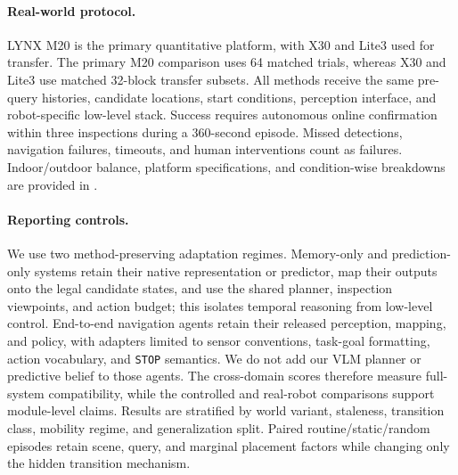 \paragraph{}

\paragraph{Real-world protocol.}
LYNX M20 is the primary quantitative platform, with X30 and Lite3 used for
transfer. The primary M20 comparison uses 64 matched trials, whereas X30 and
Lite3 use matched 32-block transfer subsets. All methods receive the same
pre-query histories, candidate locations, start conditions, perception interface,
and robot-specific low-level stack. Success requires autonomous online
confirmation within three inspections during a 360-second episode. Missed
detections, navigation failures, timeouts, and human interventions count as
failures. Indoor/outdoor balance, platform specifications, and condition-wise
breakdowns are provided in .

\paragraph{Reporting controls.}
We use two method-preserving adaptation regimes. Memory-only and
prediction-only systems retain their native representation or predictor, map
their outputs onto the legal candidate states, and use the shared planner,
inspection viewpoints, and action budget; this isolates temporal reasoning
from low-level control. End-to-end navigation agents retain their released
perception, mapping, and policy, with adapters limited to sensor conventions,
task-goal formatting, action vocabulary, and \texttt{STOP} semantics. We do not
add our VLM planner or predictive belief to those agents. The cross-domain
scores therefore measure full-system compatibility, while the controlled
\evolvingworldbench{} and real-robot comparisons support module-level claims. Results are
stratified by world variant, staleness, transition class, mobility regime, and
generalization split. Paired routine/static/random episodes retain scene,
query, and marginal placement factors while changing only the hidden
transition mechanism.


